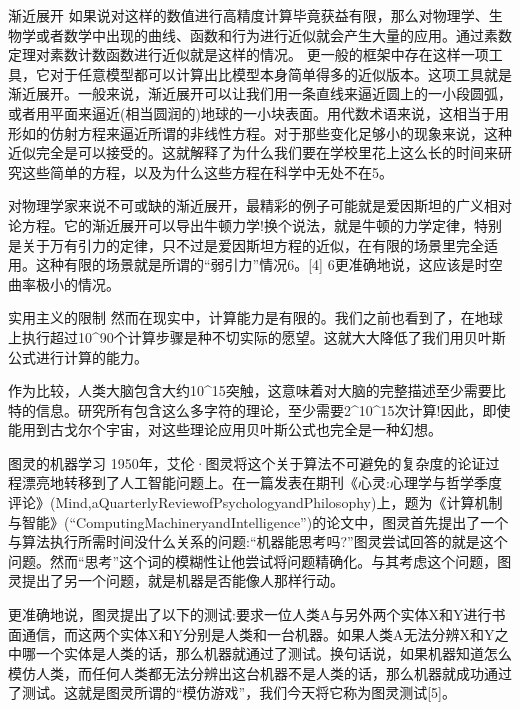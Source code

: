 渐近展开
如果说对这样的数值进行高精度计算毕竟获益有限，那么对物理学、生物学或者数学中出现的曲线、函数和行为进行近似就会产生大量的应用。通过素数定理对素数计数函数进行近似就是这样的情况。
更一般的框架中存在这样一项工具，它对于任意模型都可以计算出比模型本身简单得多的近似版本。这项工具就是渐近展开。一般来说，渐近展开可以让我们用一条直线来逼近圆上的一小段圆弧，或者用平面来逼近(相当圆润的)地球的一小块表面。用代数术语来说，这相当于用形如的仿射方程来逼近所谓的非线性方程。对于那些变化足够小的现象来说，这种近似完全是可以接受的。这就解释了为什么我们要在学校里花上这么长的时间来研究这些简单的方程，以及为什么这些方程在科学中无处不在5。

对物理学家来说不可或缺的渐近展开，最精彩的例子可能就是爱因斯坦的广义相对论方程。它的渐近展开可以导出牛顿力学!换个说法，就是牛顿的力学定律，特别是关于万有引力的定律，只不过是爱因斯坦方程的近似，在有限的场景里完全适用。这种有限的场景就是所谓的“弱引力”情况6。[4]
6更准确地说，这应该是时空曲率极小的情况。

实用主义的限制
然而在现实中，计算能力是有限的。我们之前也看到了，在地球上执行超过10^90个计算步骤是种不切实际的愿望。这就大大降低了我们用贝叶斯公式进行计算的能力。

作为比较，人类大脑包含大约10^15突触，这意味着对大脑的完整描述至少需要比特的信息。研究所有包含这么多字符的理论，至少需要2^{10^15}次计算!因此，即使能用到古戈尔个宇宙，对这些理论应用贝叶斯公式也完全是一种幻想。

图灵的机器学习
1950年，艾伦·图灵将这个关于算法不可避免的复杂度的论证过程漂亮地转移到了人工智能问题上。在一篇发表在期刊《心灵:心理学与哲学季度评论》(Mind,aQuarterlyReviewofPsychologyandPhilosophy)上，题为《计算机制与智能》(“ComputingMachineryandIntelligence”)的论文中，图灵首先提出了一个与算法执行所需时间没什么关系的问题:“机器能思考吗?”图灵尝试回答的就是这个问题。然而“思考”这个词的模糊性让他尝试将问题精确化。与其考虑这个问题，图灵提出了另一个问题，就是机器是否能像人那样行动。

更准确地说，图灵提出了以下的测试:要求一位人类A与另外两个实体X和Y进行书面通信，而这两个实体X和Y分别是人类和一台机器。如果人类A无法分辨X和Y之中哪一个实体是人类的话，那么机器就通过了测试。换句话说，如果机器知道怎么模仿人类，而任何人类都无法分辨出这台机器不是人类的话，那么机器就成功通过了测试。这就是图灵所谓的“模仿游戏”，我们今天将它称为图灵测试[5]。

